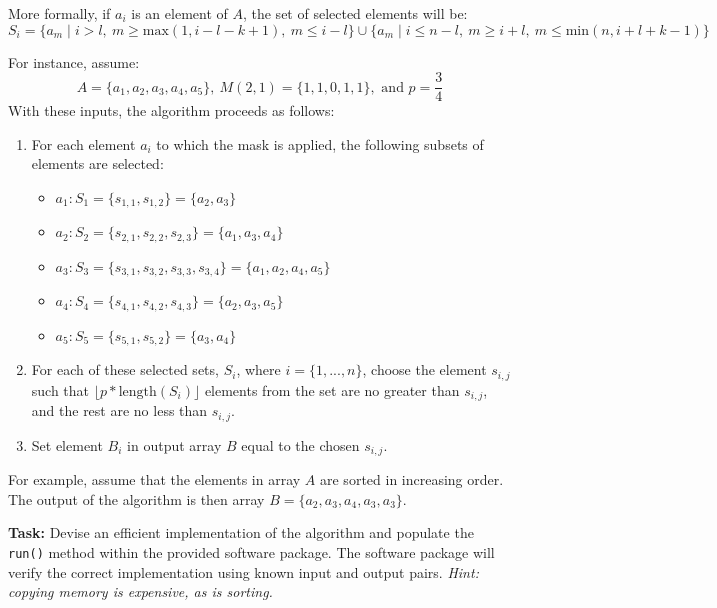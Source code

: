 \documentclass{article}
\begin{document}
\begin{flushleft}
More formally, if $a_{i}$ is an element of $A$, the set of selected elements will be: \[ S_{i}=\big\{a_{m}\mid i>l,\ m\geq \text{max}(1, i-l-k+1),\ m\leq i-l\big\} \cup \big\{a_{m}\mid i\leq n-l,\ m\geq i+l,\ m\leq \text{min}(n, i+l+k-1)\big\} \] \par

For instance, assume:\[ A=\{a_{1}, a_{2}, a_{3}, a_{4}, a_{5}\},\ M(2,1)=\{1,1,0,1,1\}, \text{ and } p=\frac{3}{4} \]
With these inputs, the algorithm proceeds as follows:
\begin{enumerate}
  \item For each element $a_{i}$ to which the mask is applied, the following subsets of elements are selected:
  \begin{itemize}
    \item[\textendash] $a_{1}:S_{1}=\{s_{1,1},s_{1,2}\}=\{a_{2},a_{3}\}$
    \item[\textendash] $a_{2}:S_{2}=\{s_{2,1},s_{2,2},s_{2,3}\}=\{a_{1},a_{3},a_{4}\}$
    \item[\textendash] $a_{3}:S_{3}=\{s_{3,1},s_{3,2},s_{3,3},s_{3,4}\}=\{a_{1},a_{2},a_{4},a_{5}\}$
    \item[\textendash] $a_{4}:S_{4}=\{s_{4,1},s_{4,2},s_{4,3}\}=\{a_{2},a_{3},a_{5}\}$
    \item[\textendash] $a_{5}:S_{5}=\{s_{5,1},s_{5,2}\}=\{a_{3},a_{4}\}$
  \end{itemize}
  \item For each of these selected sets, $S_{i}$, where $i=\{1, ...,n\}$, choose the element $s_{i,j}$ such that $\lfloor p*\text{length}(S_{i})\rfloor$ elements from the set are no greater than $s_{i,j}$, and the rest are no less than $s_{i,j}$.
  \item Set element $B_{i}$ in output array $B$ equal to the chosen $s_{i,j}$. 
\end{enumerate}  
For example, assume that the elements in array $A$ are sorted in increasing order. The output of the algorithm is then array $B=\{a_{2},a_{3},a_{4},a_{3},a_{3}\}$.

\textbf{Task: }Devise an efficient implementation of the algorithm and populate the \texttt{run()} method within the provided software package. The software package will verify the correct implementation using known input and output pairs. \emph{Hint: copying memory is expensive, as is sorting.}

\end{flushleft}
\end{document}
